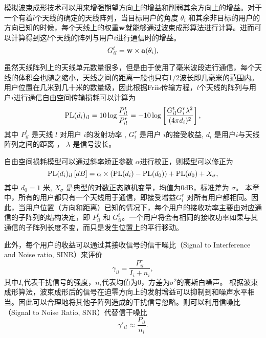 模拟波束成形技术可以用来增强期望方向上的增益和削弱其余方向上的增益。对于一个有着$l$个天线的确定的天线阵列，当目标用户的角度 $\theta_i$ 和其余非目标的用户的方向已知的时候，每个天线上的权重$\textbf w$就能够通过波束成形算法进行计算。进而可以计算得到这$l$个天线的阵列与用户$i$进行通信时的增益。
\begin{equation}\label{eq:1}
{G_{il}^t} = \textbf w \times \mathbf{a}(\theta_i),
\end{equation}

虽然天线阵列上的天线单元数量很多，但是由于使用了毫米波段进行通信，每个天线的体积会也随之缩小，天线之间的距离一般也只有1/2波长即几毫米的范围内。用户位置在几米到几十米的数量级，因此根据Friis传输方程\cite{roh2014millimeter}，$l$个天线的阵列与用户$i$进行通信自由空间传输损耗可以计算为
\begin{equation}
{\rm PL}(d_i)_{il} = 10\log{\frac{P_{il}^t}{P_{il}^r}} = -10\log\left[\frac{G_{il}^tG_{i}^r\lambda^2}{(4\pi d_i)^2}\right],
\end{equation}
其中 $P_{il}^t$ 是天线 $l$ 对用户 $i$的发射功率 , $G_i^r$ 是用户 $i$的接受收益,  $d_i$ 是用户$i$与天线阵列之间的距离 ， $\lambda$ 是信号波长。

自由空间损耗模型可以通过斜率矫正参数 $\alpha$进行校正\cite{sulyman2016directional}，则模型可以修正为
\begin{equation}
{\rm PL}(d_i)_{il}\left[dB\right] =  \alpha \times({\rm PL}(d_i)-{\rm PL}(d_0))+{\rm PL}(d_0)+X_{\sigma},
\end{equation}
其中 $d_0 = 1$ 米,  $X_\sigma$ 是典型的对数正态随机变量，均值为$0$dB，标准差为 $\sigma$。
本章中，所有的用户都只有一个天线用于通信，即接受增益$G_i^r$ 对所有用户都相同。因此，当用户位置（方向和距离）已知的情况下，每个用户的接收功率主要由对应通信的子阵列的结构决定，即 $P_{il}^t$ 和 $G_{il}^t$。一个用户将会有相同的接收功率如果与其通信的子阵列长度不变，而只是发生位置上的平行移动。

此外，每个用户的收益可以通过其接收信号的信干噪比（Signal to Interference and Noise ratio, SINR）来评价
\begin{equation}
{\gamma_{il}} = \frac{{{P_{il}^r}}}{{{I_i} + {n_i}}},
\end{equation}
其中$I_i$代表干扰信号的强度，$n_i$代表均值为$0$，方差为$\sigma^2$的高斯白噪声。
根据波束成形算法\cite{carlson1988covariance}，波束成形后的信号在迫零方向上的发射增益可以抑制到和噪声水平相当。因此可以合理地将其他子阵列造成的干扰信号忽略。则可以利用信噪比（Signal to Noise Ratio, SNR）代替信干噪比
\begin{equation}
{\gamma'_{il}} \approx \frac{{{P_{il}}}}{{n_i}}.
\end{equation}


